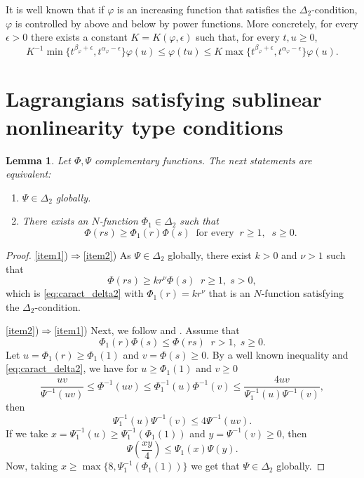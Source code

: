 \documentclass[twoside]{article}
\newtheorem{lem}[thm]{Lemma}
\theoremstyle{remark}
\renewcommand{\leq}{\leqslant}
\renewcommand{\geq}{\geqslant}
\begin{document}
 It is well known   that if $\varphi$ is an increasing function that satisfies the $\Delta_2$-condition, $\varphi$ is controlled by above and below 
 by power functions.  More concretely, for every $\epsilon>0$ there exists a
constant $K=K(\varphi,\epsilon)$ such that, for every $t,u\geq 0$,
\begin{equation}\label{delta2-potencias}
    K^{-1}\min\big\{t^{\beta_{\varphi}+\epsilon},t^{\alpha_{\varphi}-\epsilon} \big\}\varphi(u)\leq \varphi(t u)\leq
    K\max\big\{t^{\beta_{\varphi}+\epsilon},t^{\alpha_{\varphi}-\epsilon} \big\}\varphi(u).
\end{equation}



\section{Lagrangians satisfying  sublinear nonlinearity type conditions}
\begin{lem}
Let $\Phi,\Psi$ complementary functions.
The next statements are equivalent:
\begin{enumerate}
\item\label{item1} $\Psi \in \Delta_2$ globally.
\item\label{item2} There exists an $N$-function $\Phi_1 \in \Delta_2$ such that
\begin{equation}\label{eq:caract_delta2}
\Phi(rs)\geq \Phi_1(r)\Phi(s)\;\;\mbox{for every}\;\;r\geq1,\;\;s\geq 0.
\end{equation}
\end{enumerate}
\end{lem}

\begin{proof}
\ref{item1})$\Rightarrow$\ref{item2}) As $\Psi \in  \Delta_2$ globally, there exist $k>0$ and $\nu>1$ such that
\[
\Phi(rs)\geq k r^\nu \Phi(s)\;\;r\geq 1,\;s>0,
\]
which is \eqref{eq:caract_delta2} with $\Phi_1(r)=kr^\nu$ that is an $N$-function satisfying the $\Delta_2$-condition.

\ref{item2})$\Rightarrow$\ref{item1})
Next, we follow  \cite[p. 32, Prop. 13]{rao1991theory} and \cite[p. 29, Prop. 9]{rao1991theory}.
Assume that 
\[
\Phi_1(r)\Phi(s)\leq \Phi(rs)\;\;r>1,\;s\geq 0.
\]
Let $u=\Phi_1(r)\geq \Phi_1(1)$ and $v=\Phi(s)\geq 0$. By a well known inequality \cite[p. 13, Prop. 1]{rao1991theory} and \eqref{eq:caract_delta2},  we have  for $u\geq \Phi_1(1)$ and $v\geq 0$
\[
\frac{uv}{\Psi^{-1}(uv)}\leq \Phi^{-1}(uv)\leq\Phi_1^{-1}(u)\Phi^{-1}(v)\leq
\frac{4uv}{\Psi_1^{-1}(u)\Psi^{-1}(v)},
\]
then 
\[
\Psi^{-1}_1(u)\Psi^{-1}(v)\leq 4 \Psi^{-1}(uv).
\]
If we take $x=\Psi^{-1}_1(u)\geq \Psi^{-1}_1(\Phi_1(1))$ and $y=\Psi^{-1}(v)\geq 0$, then 
\[
\Psi\left(\frac{xy}{4}\right)\leq \Psi_1(x)\Psi(y).
\]
Now, taking  $x\geq \max\{8,\Psi_1^{-1}(\Phi_1(1))\}$ we get that $\Psi \in \Delta_2$ globally.
\end{proof}
\end{document}
